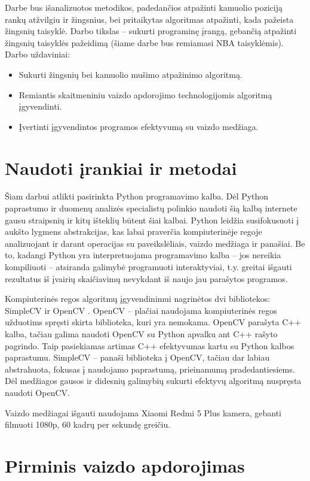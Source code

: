 \documentclass{VUMIFPSkursinis}
\begin{document}
Darbe bus išanalizuotos metodikos, padedančios atpažinti kamuolio poziciją rankų atžvilgiu ir žingsnius, bei pritaikytas algoritmas atpažinti, kada pažeista žingsnių taisyklė. Darbo tikslas – sukurti programinę įrangą, gebančią atpažinti žingsnių taisyklės pažeidimą (šiame darbe bus remiamasi NBA taisyklėmis). Darbo uždaviniai:
\begin{itemize}
 \item Sukurti žingsnių bei kamuolio mušimo atpažinimo algoritmą.
 \item Remiantis skaitmeniniu vaizdo apdorojimo technologijomis algoritmą įgyvendinti.
 \item Įvertinti įgyvendintos programos efektyvumą su vaizdo medžiaga.
\end{itemize}

\section{Naudoti įrankiai ir metodai}
Šiam darbui atlikti pasirinkta Python programavimo kalba. Dėl Python paprastumo ir duomenų analizės specialistų polinkio naudoti šią kalbą internete gausu straipsnių ir kitų išteklių būtent šiai kalbai. Python leidžia susifokusuoti į aukšto lygmens abstrakcijas, kas labai praverčia kompiuterinėje regoje analizuojant ir darant operacijas su paveikslėliais, vaizdo medžiaga ir panašiai. Be to, kadangi Python yra interpretuojama programavimo kalba – jos nereikia kompiliuoti – atsiranda galimybė programuoti interaktyviai, t.y. greitai išgauti rezultatus iš įvairių skaičiavimų nevykdant iš naujo jau parašytos programos. 

Kompiuterinės regos algoritmų įgyvendinimui nagrinėtos dvi bibliotekos: SimpleCV \cite{SimpleCV} ir OpenCV \cite{OpenCV}. OpenCV – plačiai naudojama kompiuterinės regos užduotims spręsti skirta biblioteka, kuri yra nemokama. OpenCV parašyta C++ kalba, tačiau galima naudoti OpenCV su  Python apvalku ant C++ rašyto pagrindo. Taip pasiekiamas artimas C++ efektyvumas kartu su Python kalbos paprastumu.
SimpleCV – panaši biblioteka į OpenCV, tačiau dar labiau abstrahuota, fokusas į naudojamo paprastumą, prieinamumą pradedantiesiems. Dėl medžiagos gausos ir didesnių galimybių sukurti efektyvų algoritmą nuspręsta naudoti OpenCV.

Vaizdo medžiagai išgauti naudojama Xiaomi Redmi 5 Plus kamera, gebanti filmuoti 1080p, 60 kadrų per sekundę greičiu. 
\section{Pirminis vaizdo apdorojimas}
\end{document}

